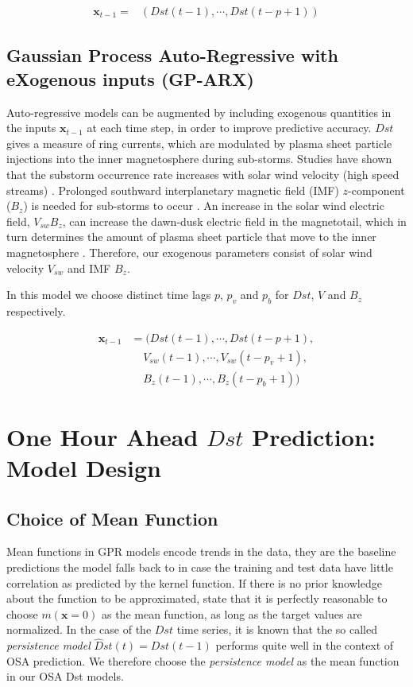 \documentclass{article}
\begin{document}
\begin{align*}
    \mathbf{x}_{t-1} = & \left(Dst(t-1), \cdots , Dst(t-p+1)\right)
\end{align*}

\subsection{Gaussian Process Auto-Regressive with eXogenous inputs (GP-ARX)} \label{sec:gparx}

Auto-regressive models can be augmented by including exogenous quantities in the inputs $\mathbf{x}_{t-1}$ at each time step, in order to improve predictive accuracy. $Dst$ gives a measure of ring currents, which are modulated by plasma sheet particle injections into the inner magnetosphere during sub-storms. Studies have shown that the substorm occurrence rate increases with solar wind velocity (high speed streams) \citet{Kissinger2011,Newell2016}. Prolonged southward interplanetary magnetic field (IMF) $z$-component ($B_z$) is needed for sub-storms to occur \citet{McPherron1986}. An increase in the solar wind electric field, $V_{sw}B_z$, can increase the dawn-dusk electric field in the magnetotail, which in turn determines the amount of plasma sheet particle that move to the inner magnetosphere \citet{Friedel2001}. Therefore, our exogenous parameters consist of solar wind velocity $V_{sw}$ and IMF $B_z$.   

In this model we choose distinct time lags $p$, $p_{v}$ and $p_{b}$ for $Dst$, $V$ and $B_z$ respectively.
    
\begin{align*}
       \mathbf{x}_{t-1} & = (Dst(t-1), \cdots , Dst(t-p+1), \\
        & \ \ \ \ \  V_{sw}(t-1), \cdots, V_{sw}(t-p_{v}+1),\\
        & \ \ \ \ \  B_{z}(t-1), \cdots, B_{z}(t-p_{b}+1))
\end{align*}

\section{One Hour Ahead $Dst$ Prediction: Model Design}\label{sec:modeldesign}

\subsection{Choice of Mean Function}

Mean functions in GPR models encode trends in the data, they are the baseline predictions the model falls back to in case the training and test data have little correlation as predicted by the kernel function. If there is no prior knowledge about the function to be approximated, \citet{Rasmussen:2005:GPM:1162254} state that it is perfectly reasonable to choose $m(\mathbf{x} = 0)$ as the mean function, as long as the target values are normalized. In the case of the $Dst$ time series, it is known that the so called \emph{persistence model} $\hat{D}st(t) = Dst(t-1)$ performs quite well in the context of OSA prediction. We therefore choose the \emph{persistence model} as the mean function in our OSA Dst models.
\end{document}
